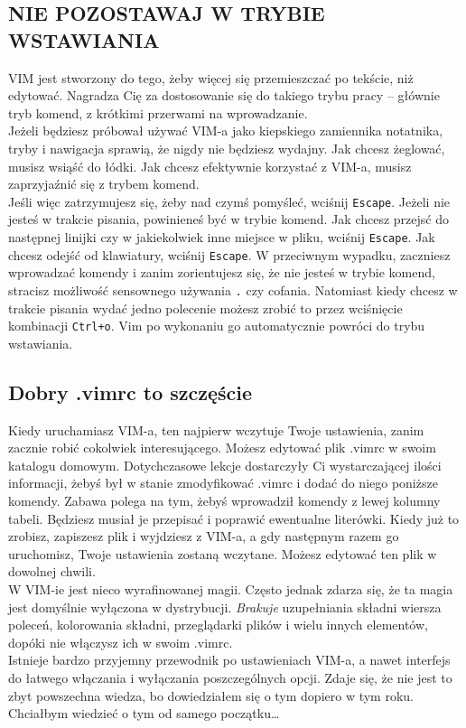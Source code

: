 \documentclass[a4paper,12pt]{article}
\begin{document}
\subsection{NIE POZOSTAWAJ W TRYBIE WSTAWIANIA}
VIM jest stworzony do tego, żeby więcej się przemieszczać po tekście, niż edytować. Nagradza Cię za dostosowanie się do takiego trybu pracy – głównie tryb komend, z krótkimi przerwami na wprowadzanie. \\
Jeżeli będziesz próbował używać VIM-a jako kiepskiego zamiennika notatnika, tryby i nawigacja sprawią, że nigdy nie będziesz wydajny. Jak chcesz żeglować, musisz wsiąść do łódki. Jak chcesz efektywnie korzystać z VIM-a, musisz zaprzyjaźnić się z trybem komend.\\
Jeśli więc zatrzymujesz się, żeby nad czymś pomyśleć, wciśnij {\tt Escape}. Jeżeli nie jesteś w trakcie pisania, powinieneś być w trybie komend. Jak chcesz przejsć do następnej linijki czy w jakiekolwiek inne miejsce w pliku, wciśnij {\tt Escape}. Jak chcesz odejść od klawiatury, wciśnij {\tt Escape}. W przeciwnym wypadku, zaczniesz wprowadzać komendy i zanim zorientujesz się, że nie jesteś w trybie komend, stracisz możliwość sensownego używania {\tt .} czy cofania. Natomiast kiedy chcesz w trakcie pisania wydać jedno polecenie możesz zrobić to przez wciśnięcie kombinacji {\tt Ctrl+o}. Vim po wykonaniu go automatycznie powróci do trybu wstawiania.
\subsection{Dobry .vimrc to szczęście}
Kiedy uruchamiasz VIM-a, ten najpierw wczytuje Twoje ustawienia, zanim zacznie robić cokolwiek interesującego. Możesz edytować plik .vimrc w swoim katalogu domowym. Dotychczasowe lekcje dostarczyły Ci wystarczającej ilości informacji, żebyś był w stanie zmodyfikować .vimrc i dodać do niego poniższe komendy. Zabawa polega na tym, żebyś wprowadził komendy z lewej kolumny tabeli. Będziesz musiał je przepisać i poprawić ewentualne literówki. Kiedy już to zrobisz, zapiszesz plik i wyjdziesz z VIM-a, a gdy następnym razem go uruchomisz, Twoje ustawienia zostaną wczytane. Możesz edytować ten plik w dowolnej chwili.\\
W VIM-ie jest nieco wyrafinowanej magii. Często jednak zdarza się, że ta magia jest domyślnie wyłączona w dystrybucji. {\it Brakuje} uzupełniania składni wiersza poleceń, kolorowania składni, przeglądarki plików i wielu innych elementów, dopóki nie włączysz ich w swoim .vimrc.\\
Istnieje bardzo przyjemny przewodnik po ustawieniach VIM-a, a nawet interfejs do łatwego włączania i wyłączania poszczególnych opcji. Zdaje się, że nie jest to zbyt powszechna wiedza, bo dowiedziałem się o tym dopiero w tym roku. Chciałbym wiedzieć o tym od samego początku\ldots
\end{document}
